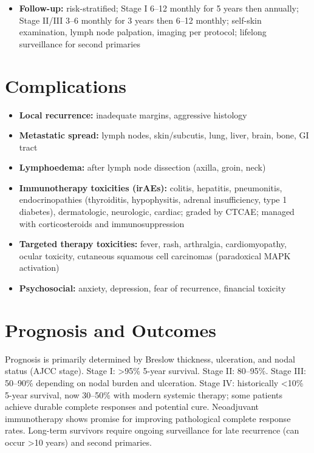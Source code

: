 \begin{itemize}
\begin{itemize}
        \item \textbf{Brain metastases:} stereotactic radiosurgery (SRS) preferred; immunotherapy has intracranial activity; targeted therapy crosses blood-brain barrier
        \item \textbf{Radiotherapy:} palliative for bone, symptomatic brain, spinal cord compression
        \item \textbf{Clinical trials:} novel combinations, neoadjuvant approaches, TIL therapy, vaccines
    \end{itemize}
    \item \textbf{Follow-up:} risk-stratified; Stage I 6--12 monthly for 5 years then annually; Stage II/III 3--6 monthly for 3 years then 6--12 monthly; self-skin examination, lymph node palpation, imaging per protocol; lifelong surveillance for second primaries
\end{itemize}

\section*{Complications}
\begin{itemize}
    \item \textbf{Local recurrence:} inadequate margins, aggressive histology
    \item \textbf{Metastatic spread:} lymph nodes, skin/subcutis, lung, liver, brain, bone, GI tract
    \item \textbf{Lymphoedema:} after lymph node dissection (axilla, groin, neck)
    \item \textbf{Immunotherapy toxicities (irAEs):} colitis, hepatitis, pneumonitis, endocrinopathies (thyroiditis, hypophysitis, adrenal insufficiency, type 1 diabetes), dermatologic, neurologic, cardiac; graded by CTCAE; managed with corticosteroids and immunosuppression
    \item \textbf{Targeted therapy toxicities:} fever, rash, arthralgia, cardiomyopathy, ocular toxicity, cutaneous squamous cell carcinomas (paradoxical MAPK activation)
    \item \textbf{Psychosocial:} anxiety, depression, fear of recurrence, financial toxicity
\end{itemize}

\section*{Prognosis and Outcomes}
Prognosis is primarily determined by Breslow thickness, ulceration, and nodal status (AJCC stage). Stage I: >95\% 5-year survival. Stage II: 80--95\%. Stage III: 50--90\% depending on nodal burden and ulceration. Stage IV: historically <10\% 5-year survival, now 30--50\% with modern systemic therapy; some patients achieve durable complete responses and potential cure. Neoadjuvant immunotherapy shows promise for improving pathological complete response rates. Long-term survivors require ongoing surveillance for late recurrence (can occur >10 years) and second primaries.

